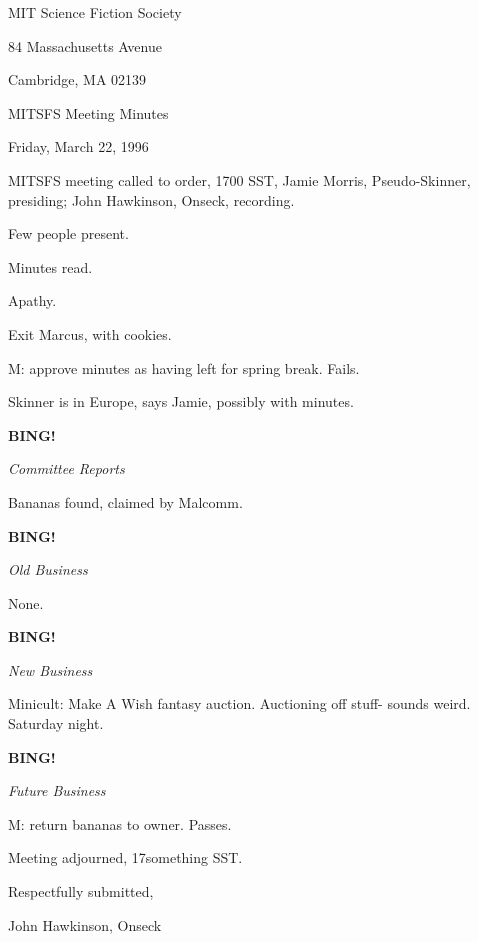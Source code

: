 \documentclass[12pt]{article}
\newcommand{\bing}{{\bf BING!} }
\newcommand{\goto}[1]{\bing \vskip 12pt \centerline{{\em{#1}}}}
\begin{document}
\begin{center}

MIT Science Fiction Society 

84 Massachusetts Avenue

Cambridge, MA 02139

\vspace{12pt}

MITSFS Meeting Minutes 

Friday, March 22, 1996

\end{center}
 
\vspace{18pt}

\setlength{\parskip}{6pt}

\noindent
MITSFS meeting called to order, 1700 SST,
Jamie Morris, Pseudo-Skinner, presiding; John Hawkinson, Onseck, recording.

Few people present.

Minutes read.

Apathy.

Exit Marcus, with cookies.

M: approve minutes as having left for spring break. Fails.

Skinner is in Europe, says Jamie, possibly with minutes.

\goto{Committee Reports}

Bananas found, claimed by Malcomm.

\goto{Old Business}

None.

\goto{New Business}

Minicult: Make A Wish fantasy auction. Auctioning off stuff- sounds weird. Saturday night.

\goto{Future Business}

M: return bananas to owner. Passes.

\vspace{12pt}

\noindent
Meeting adjourned, 17something SST.

\vspace{18pt}

\centerline{Respectfully submitted,}
\centerline{John Hawkinson, Onseck}
\end{document}
